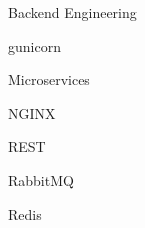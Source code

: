 \begin{skillset}{Backend Engineering}
  \item gunicorn
  \item Microservices
  \item NGINX
  \item REST
  \item RabbitMQ
  \item Redis
\end{skillset}
